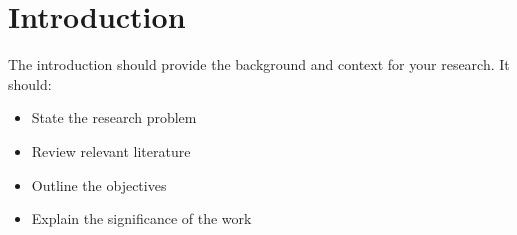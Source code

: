 \section{Introduction}
\label{sec:introduction}
The introduction should provide the background and context for your research. It should:
\begin{itemize}
    \item State the research problem
    \item Review relevant literature
    \item Outline the objectives
    \item Explain the significance of the work
\end{itemize} 